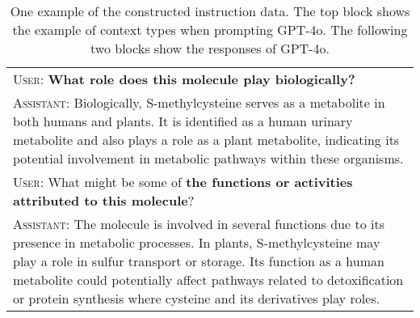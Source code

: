 \begin{table*}[t!]
\begin{tcolorbox}[colframe=gray,colback=white,boxrule=1pt,arc=0.6em,boxsep=0mm,left=5.pt,right=15pt]
\begin{tabular}{p{}}
\textsc{User}: \textbf{What role does this molecule play biologically?}\\
\textsc{Assistant}: Biologically, S-methylcysteine serves as a metabolite in both humans and plants. It is identified as a human urinary metabolite and also plays a role as a plant metabolite, indicating its potential involvement in metabolic pathways within these organisms.\\

\textsc{User}: What might be some of \textbf{the functions or activities attributed to this molecule}?\\
\textsc{Assistant}: The molecule is involved in several functions due to its presence in metabolic processes. In plants, S-methylcysteine may play a role in sulfur transport or storage. Its function as a human metabolite could potentially affect pathways related to detoxification or protein synthesis where cysteine and its derivatives play roles.\\
\end{tabular}
\end{tcolorbox}
\vspace{-0.1in}
\caption{One example of the constructed instruction data. The top block shows the example of context types when prompting GPT-4o. The following two blocks show the responses of GPT-4o.}
\label{app:tab:data_example_full_part2}
\end{table*}
